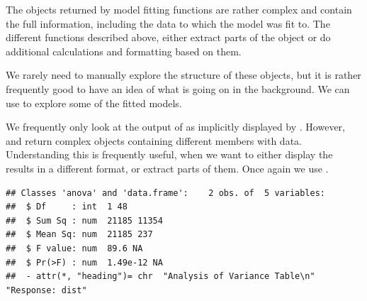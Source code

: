 \documentclass[krantz2]{krantz}\usepackage{knitr}%
\begin{document}
\begin{explainbox}
The objects returned by model fitting functions are rather complex and contain the full information, including the data to which the model was fit to. The different functions described above, either extract parts of the object or do additional calculations and formatting based on them.

We rarely need to manually explore the structure of these objects, but it is rather frequently good to have an idea of what is going on in the background. We can use  to explore some of the fitted models.

\begin{knitrout}\footnotesize
{}\color{fgcolor}\begin{kframe}
\begin{alltt}
  \hlstd{=} \hlstd{)} 
\end{alltt}
\end{kframe}
\end{knitrout}

We frequently only look at the output of  as implicitly displayed by . However,  and  return complex objects containing different members with data. Understanding this is frequently useful, when we want to either display the results in a different format, or extract parts of them. Once again we use .

\begin{knitrout}\footnotesize
{}\color{fgcolor}\begin{kframe}
\begin{alltt}
\hlstd{(}
\end{alltt}
\begin{verbatim}
## Classes 'anova' and 'data.frame':	2 obs. of  5 variables:
##  $ Df     : int  1 48
##  $ Sum Sq : num  21185 11354
##  $ Mean Sq: num  21185 237
##  $ F value: num  89.6 NA
##  $ Pr(>F) : num  1.49e-12 NA
##  - attr(*, "heading")= chr  "Analysis of Variance Table\n" "Response: dist"
\end{verbatim}
\end{kframe}
\end{knitrout}


\end{explainbox}
\end{document}
